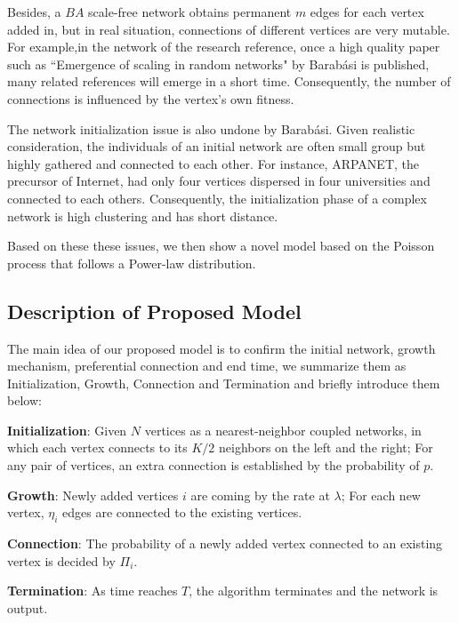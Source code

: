 \documentclass[final]{IEEEtran}
\begin{document}
Besides, a $BA$ scale-free network obtains permanent $m$ edges for
each vertex added in, but in real situation, connections of
different vertices are very mutable. For example,in the network of
the research reference, once a high quality paper such as
``Emergence of scaling in random networks" by Barab\'{a}si is
published, many related references will emerge in a short time.
Consequently, the number of connections is influenced by the
vertex's own fitness.

The network initialization issue is also undone by Barab\'{a}si.
Given realistic consideration, the individuals of an initial
network are often small group but highly gathered and connected to
each other. For instance, ARPANET, the precursor of Internet, had
only four vertices dispersed in four universities and connected to
each others. Consequently, the initialization phase of a complex
network is high clustering and has short distance.

Based on these these issues, we then show a novel model based on
the Poisson process that follows a Power-law distribution.




\subsection{Description of Proposed Model}

The main idea of our proposed model is to confirm the initial
network, growth mechanism, preferential connection and end time,
we summarize them as Initialization, Growth, Connection and
Termination and briefly introduce them below:

\textbf{Initialization}: Given $N$ vertices as a nearest-neighbor
coupled networks, in which each vertex connects to its $K/2$
neighbors on the left and the right; For any pair of vertices, an
extra connection is established by the probability of $p$.




\textbf{Growth}: Newly added vertices $i$ are coming by the rate
at $\lambda$; For each new vertex, $\eta_{i}$ edges are connected
to the existing vertices.



\textbf{Connection}: The probability of a newly added vertex
connected to an existing vertex is decided by $\Pi_{i}$.

\textbf{Termination}: As time reaches $T$, the algorithm
terminates and the network is output.
\end{document}
